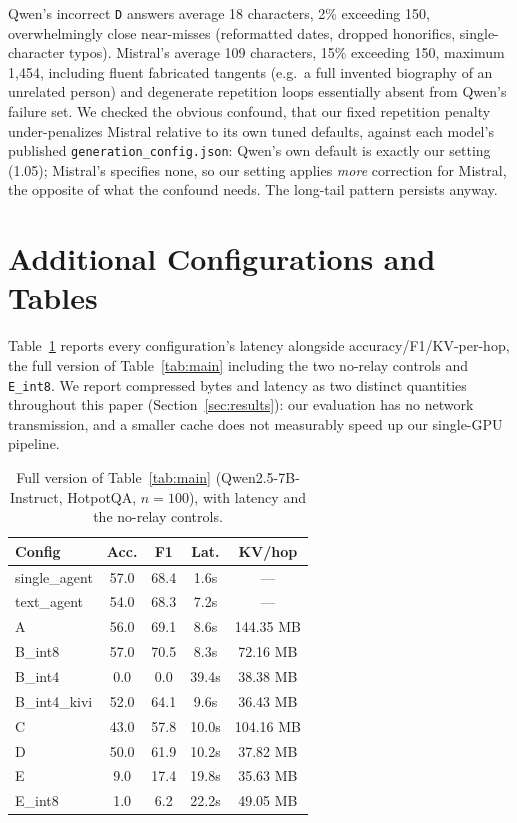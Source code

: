 \documentclass[11pt]{article}
\begin{document}
Qwen's incorrect \texttt{D} answers average 18 characters, 2\%
exceeding 150, overwhelmingly close near-misses (reformatted dates,
dropped honorifics, single-character typos). Mistral's average 109
characters, 15\% exceeding 150, maximum 1,454, including fluent
fabricated tangents (e.g.\ a full invented biography of an unrelated
person) and degenerate repetition loops essentially absent from Qwen's
failure set. We checked the obvious confound, that our fixed
repetition penalty under-penalizes Mistral relative to its own tuned
defaults, against each model's published \texttt{generation\_config.json}:
Qwen's own default is exactly our setting (1.05); Mistral's specifies
none, so our setting applies \emph{more} correction for Mistral, the
opposite of what the confound needs. The long-tail pattern persists
anyway.

\section{Additional Configurations and Tables}
\label{app:extratables}

Table~\ref{tab:full} reports every configuration's latency alongside
accuracy/F1/KV-per-hop, the full version of Table~\ref{tab:main}
including the two no-relay controls and \texttt{E\_int8}. We report
compressed bytes and latency as two distinct quantities throughout this
paper (Section~\ref{sec:results}): our evaluation has no network
transmission, and a smaller cache does not measurably speed up our
single-GPU pipeline.

\begin{table}[h]
\centering
\small
\begin{tabular}{lcccc}
\toprule
\textbf{Config} & \textbf{Acc.} & \textbf{F1} & \textbf{Lat.} & \textbf{KV/hop} \\
\midrule
single\_agent & 57.0 & 68.4 & 1.6s & --- \\
text\_agent & 54.0 & 68.3 & 7.2s & --- \\
A & 56.0 & 69.1 & 8.6s & 144.35 MB \\
B\_int8 & 57.0 & 70.5 & 8.3s & 72.16 MB \\
B\_int4 & 0.0 & 0.0 & 39.4s & 38.38 MB \\
B\_int4\_kivi & 52.0 & 64.1 & 9.6s & 36.43 MB \\
C & 43.0 & 57.8 & 10.0s & 104.16 MB \\
D & 50.0 & 61.9 & 10.2s & 37.82 MB \\
E & 9.0 & 17.4 & 19.8s & 35.63 MB \\
E\_int8 & 1.0 & 6.2 & 22.2s & 49.05 MB \\
\bottomrule
\end{tabular}
\caption{Full version of Table~\ref{tab:main} (Qwen2.5-7B-Instruct,
HotpotQA, $n=100$), with latency and the no-relay controls.}
\label{tab:full}
\end{table}
\end{document}
